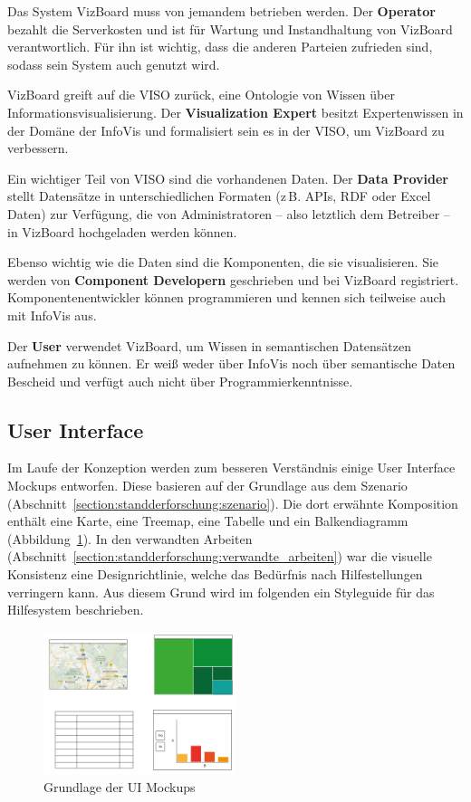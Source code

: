 \documentclass[
	headsepline,
	footsepline,
	fontsize=12pt,
	bibliography=totoc
]{scrbook}
\begin{document}
Das System VizBoard muss von jemandem betrieben werden. Der \textbf{Operator} bezahlt die Serverkosten und ist für Wartung und Instandhaltung von VizBoard verantwortlich. Für ihn ist wichtig, dass die anderen Parteien zufrieden sind, sodass sein System auch genutzt wird.

VizBoard greift auf die VISO zurück, eine Ontologie von Wissen über Informationsvisualisierung. Der \textbf{Visualization Expert} besitzt Expertenwissen in der Domäne der InfoVis und formalisiert sein es in der VISO, um VizBoard zu verbessern.

Ein wichtiger Teil von VISO sind die vorhandenen Daten. Der \textbf{Data Provider} stellt Datensätze in unterschiedlichen Formaten (z\,B. APIs, RDF oder Excel Daten) zur Verfügung, die von Administratoren -- also letztlich dem Betreiber -- in VizBoard hochgeladen werden können.

Ebenso wichtig wie die Daten sind die Komponenten, die sie visualisieren. Sie werden von \textbf{Component Developern} geschrieben und bei VizBoard registriert. Komponentenentwickler können programmieren und kennen sich teilweise auch mit InfoVis aus.

Der \textbf{User} verwendet VizBoard, um Wissen in semantischen Datensätzen aufnehmen zu können. Er weiß weder über InfoVis noch über semantische Daten Bescheid und verfügt auch nicht über Programmierkenntnisse.

\subsection{User Interface}
\label{section:konzeption:einfuehrung:ui}

Im Laufe der Konzeption werden zum besseren Verständnis einige User Interface Mockups entworfen. Diese basieren auf der Grundlage aus dem Szenario (Abschnitt~\ref{section:standderforschung:szenario}). Die dort erwähnte Komposition enthält eine Karte, eine Treemap, eine Tabelle und ein Balkendiagramm (Abbildung~\ref{figure:ui-grundlage}). In den verwandten Arbeiten (Abschnitt~\ref{section:standderforschung:verwandte_arbeiten}) war die visuelle Konsistenz eine Designrichtlinie, welche das Bedürfnis nach Hilfestellungen verringern kann. Aus diesem Grund wird im folgenden ein Styleguide für das Hilfesystem beschrieben.

\begin{figure}[htbp]
   \centering
   \includegraphics[width=0.5\textwidth]{images/konzeption-ui-grundlage.png}
   \caption{Grundlage der UI Mockups}
   \label{figure:ui-grundlage}
\end{figure}
\end{document}
